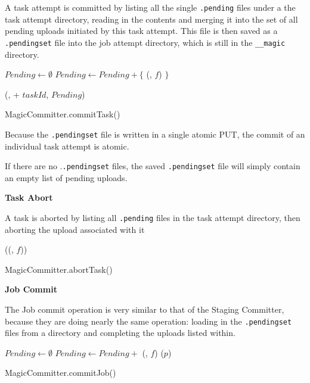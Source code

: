 \documentclass[conference]{IEEEtran}
\begin{document}

A task attempt is committed by listing all the single \texttt{.pending} files
under a the task attempt directory, reading in the contents and merging it
into the set of all pending uploads initiated by this task attempt.
This file is then saved as a \texttt{.pendingset} file into the job attempt directory,
which is still in the \texttt{__magic} directory.

\begin{procedure}
\MagicVars

  $Pending \longleftarrow \emptyset$\;
   {
    $Pending \longleftarrow Pending + \{$ \loadPendingFile(\fs, $f$) $\}$\;
  }

  \savePendingSet(\fs, \jobAttemptPath + $taskId$, $Pending$)\;

\caption{MagicCommitter.commitTask()}
\label{alg:MagicCommitter.commitTask}

\end{procedure}

Because the \texttt{.pendingset} file is written in a single atomic PUT, the
commit of an individual task attempt is atomic.

If there are no .\texttt{.pendingset} files, the saved \texttt{.pendingset} file
will simply contain an empty list of pending uploads.


\textbf{Task Abort}

A task is aborted by listing all \texttt{.pending} files in the task attempt directory,
then aborting the upload associated with it

\begin{procedure}
  \MagicVars

   {
    \abortUpload(\loadPendingFile(\fs, $f$))\;
  }

  \caption{MagicCommitter.abortTask()}
  \label{alg:MagicCommitter.abortTask}
\end{procedure}


\textbf{Job Commit}

The Job commit operation is very similar to that of the Staging Committer, because
they are doing nearly the same operation: loading in the \texttt{.pendingset} files
from a directory and completing the uploads listed within.

\begin{procedure}
  \MagicVars

  $Pending \longleftarrow \emptyset$\;
   {
    $Pending \longleftarrow Pending + $ \loadPendingSet(\fs, $f$)\;
  }
   {
    \completeUpload($p$)\;
  }

  \caption{MagicCommitter.commitJob()}
  \label{alg:MagicCommitter.commitJob}
\end{procedure}
\end{document}
